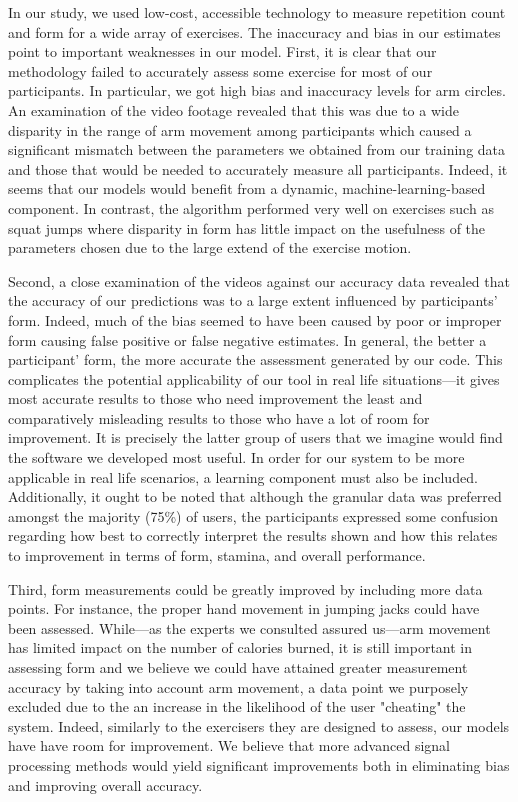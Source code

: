 In our study, we used low-cost, accessible technology to measure repetition count and form for a wide array of exercises. The inaccuracy and bias in our estimates point to important weaknesses in our model. 
First, it is clear that our methodology failed to accurately assess some exercise for most of our participants.
In particular, we got high bias and inaccuracy levels for arm circles.
An examination of the video footage revealed that this was due to a wide disparity in the range of arm movement among participants which caused a significant mismatch between the parameters we obtained from our training data and those that would be needed to accurately measure all participants. Indeed, it seems that our models would benefit from a dynamic, machine-learning-based component.
In contrast, the algorithm performed very well on exercises such as squat jumps where disparity in form has little impact on the usefulness of the parameters chosen due to the large extend of the exercise motion.

Second, a close examination of the videos against our accuracy data revealed that 
the accuracy of our predictions was to a large extent influenced by participants' form.
Indeed, much of the bias seemed to have been caused by poor or improper form causing false positive or false negative estimates.
In general, the better a participant' form, the more accurate the assessment generated by our code. 
This complicates the potential applicability of our tool in real life situations---it gives most accurate results to those who need improvement the least and comparatively misleading results to those who have a lot of room for improvement. It is precisely the latter group of users that we imagine would find the software we developed most useful. In order for our system to be more applicable in real life scenarios, a learning component must also be included.  Additionally, it ought to be noted that although the granular data was preferred amongst the majority (75\%) of users, the participants expressed some confusion regarding how best to correctly interpret the results shown and how this relates to improvement in terms of form, stamina, and overall performance.

Third, form measurements could be greatly improved by including more data points.
For instance, the proper hand movement in jumping jacks could have been assessed.
While---as the experts we consulted assured us---arm movement has limited impact on the number of calories burned, it is still important in assessing form and we believe we could have attained greater measurement accuracy by taking into account arm movement, a data point we purposely excluded due to the an increase in the likelihood of the user "cheating" the system. 
Indeed, similarly to the exercisers they are designed to assess, our models have have room for improvement. We believe that more advanced signal processing methods would yield significant improvements both in eliminating bias and improving overall accuracy.

